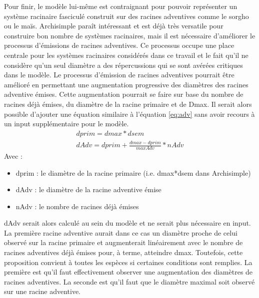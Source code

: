 Pour finir, le modèle lui-même est contraignant pour pouvoir représenter un système racinaire fasciculé construit sur des racines adventives comme le sorgho ou le maïs.
Archisimple paraît intéressant et est déjà très versatile pour construire bon nombre de systèmes racinaires, mais il est nécessaire d'améliorer le processus d'émissions de racines adventives.
Ce processus occupe une place centrale pour les systèmes racinaires considérés dans ce travail et le fait qu'il ne considère qu'un seul diamètre a des répercussions qui se sont avérées critiques dans le modèle.
Le processus d'émission de racines adventives pourrait être amélioré en permettant une augmentation progressive des diamètres des racines adventive émises.
Cette augmentation pourrait se faire sur base du nombre de racines déjà émises, du diamètre de la racine primaire et de Dmax.
Il serait alors possible d'ajouter une équation similaire à l'équation \ref{eq:adv} sans avoir recours à un input supplémentaire pour le modèle.
\begin{equation}
    \begin{gathered}
        dprim = dmax*dsem \\
        dAdv = dprim + \frac{dmax - dprim}{maxAdv}*nAdv
    \end{gathered}
    \label{eq:adv}
\end{equation}
Avec :
\begin{itemize}
    \item dprim : le diamètre de la racine primaire (i.e. dmax*dsem dans Archisimple)
    \item dAdv : le diamètre de la racine adventive émise
    \item nAdv : le nombre de racines déjà émises
\end{itemize}
dAdv serait alors calculé au sein du modèle et ne serait plus nécessaire en input.
La première racine adventive aurait dans ce cas un diamètre proche de celui observé sur la racine primaire et augmenterait linéairement avec le nombre de racines adventives déjà émises pour, à terme, atteindre dmax.
Toutefois, cette proposition convient à toutes les espèces si certaines conditions sont remplies. 
La première est qu'il faut effectivement observer une augmentation des diamètres de racines adventives.
La seconde est qu'il faut que le diamètre maximal soit observé sur une racine adventive.